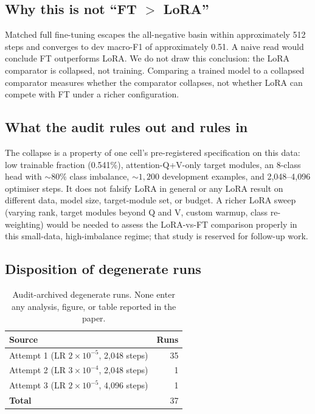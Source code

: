 \subsection{Why this is not ``FT $>$ LoRA''}

Matched full fine-tuning escapes the all-negative basin within
approximately 512 steps and converges to dev macro-F1 of approximately
0.51. A naive read would conclude FT outperforms LoRA. We do not
draw this conclusion: the LoRA comparator is collapsed, not training.
Comparing a trained model to a collapsed comparator measures whether
the comparator collapses, not whether LoRA can compete with FT under
a richer configuration.

\subsection{What the audit rules out and rules in}

The collapse is a property of one cell's pre-registered
specification on this data: low trainable fraction (0.541\%),
attention-Q+V-only target modules, an 8-class head with $\sim 80\%$
 class imbalance, $\sim 1{,}200$ development
examples, and 2{,}048--4{,}096 optimiser steps. It does not falsify
LoRA in general or any LoRA result on different data, model size,
target-module set, or budget. A richer LoRA sweep (varying rank,
target modules beyond Q and V, custom warmup, class re-weighting)
would be needed to assess the LoRA-vs-FT comparison properly in
this small-data, high-imbalance regime; that study is reserved for
follow-up work.

\subsection{Disposition of degenerate runs}

\begin{table}[H]
\centering
\caption{Audit-archived degenerate runs. None enter any analysis,
figure, or table reported in the paper.}
\label{tab:s9-disposition}
\small
\begin{tabular}{@{}lr@{}}
\toprule
\textbf{Source} & \textbf{Runs} \\
\midrule
Attempt 1 (LR $2\!\times\!10^{-5}$, 2{,}048 steps)  & 35 \\
Attempt 2 (LR $3\!\times\!10^{-4}$, 2{,}048 steps)  & 1  \\
Attempt 3 (LR $2\!\times\!10^{-5}$, 4{,}096 steps)  & 1  \\
\midrule
\textbf{Total} & 37 \\
\bottomrule
\end{tabular}
\end{table}

